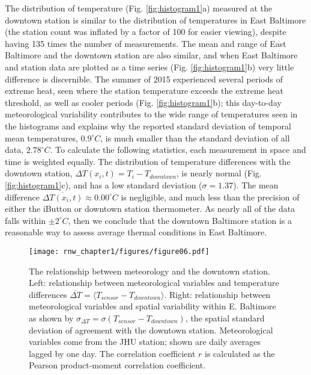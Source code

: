 The distribution of temperature (Fig. \ref{fig:histogram1}a) measured at the downtown station is similar to the distribution of temperatures in East Baltimore (the station count was inflated by a factor of 100 for easier viewing), despite having 135 times the number of measurements. The mean and range of East Baltimore and the downtown station are also similar, and when East Baltimore and station data are plotted as a time series (Fig. \ref{fig:histogram1}b) very little difference is discernible. The summer of 2015 experienced several periods of extreme heat, seen where the station temperature exceeds the extreme heat threshold, as well as cooler periods (Fig. \ref{fig:histogram1}b); this day-to-day meteorological variability contributes to the wide range of temperatures seen in the histograms and explains why the reported standard deviation of temporal mean temperatures, $0.9^{\circ} C$, is much smaller than the standard deviation of all data, $2.78 ^{\circ} C$. To calculate the following statistics, each measurement in space and time is weighted equally. The distribution of temperature differences with the downtown station, $ {\Delta T} \left(x_i,t\right) =T_i - T_{downtown}$, is nearly normal (Fig. \ref{fig:histogram1}c), and has a low standard deviation ($\sigma = 1.37$). The mean difference $\overline {\Delta T \left(x_i,t\right) } \approx 0.00^{\circ} C$ is negligible, and much less than the precision of either the iButton or downtown station thermometer. As nearly all of the data falls within $\pm 2 ^{\circ} C$, then we conclude that the downtown Baltimore station is a reasonable way to assess average thermal conditions in East Baltimore.

\begin{figure}
\noindent\texttt{[image: rnw\_chapter1/figures/figure06.pdf]}
\caption{The relationship between meteorology and the downtown station. Left: relationship between meteorological variables and temperature differences $\overline{ \Delta T }=\langle T_{sensor}- T_{downtown} \rangle$. Right: relationship between meteorological variables and spatial variability within E. Baltimore as shown by $\sigma_{\Delta T} = \sigma \left(T_{sensor}- T_{downtown} \right)$,  the spatial standard deviation of agreement with the downtown station. Meteorological variables come from the JHU station; shown are daily averages lagged by one day. The correlation coefficient $r$ is calculated as the Pearson product-moment correlation coefficient. }
\label{fig:correlation1}
\end{figure}

